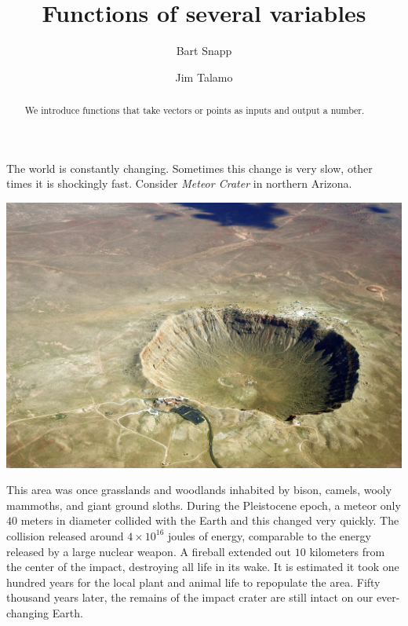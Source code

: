 \documentclass{ximera}
\author{Bart Snapp \and Jim Talamo}
\title[Dig-In:]{Functions of several variables}
\begin{document}
\begin{abstract}
  We introduce functions that take vectors or points as inputs and
  output a number.
\end{abstract}
\maketitle

The world is constantly changing. Sometimes this change is very slow,
other times it is shockingly fast. Consider \textit{Meteor Crater} in
northern Arizona.
\begin{image}[3in]
  \includegraphics{meteorcrater.jpg}
\end{image}
This area was once grasslands and woodlands inhabited by bison,
camels, wooly mammoths, and giant ground sloths. During the
Pleistocene epoch, a meteor only $40$ meters in diameter collided
with the Earth and this changed very quickly. The collision released
around $4\times10^{16}$ joules of energy, comparable to the energy
released by a large nuclear weapon. A fireball extended out $10$
kilometers from the center of the impact, destroying all life in its
wake. It is estimated it took one hundred years for the local plant
and animal life to repopulate the area.  Fifty thousand years later,
the remains of the impact crater are still intact on our ever-changing
Earth.
\end{document}
